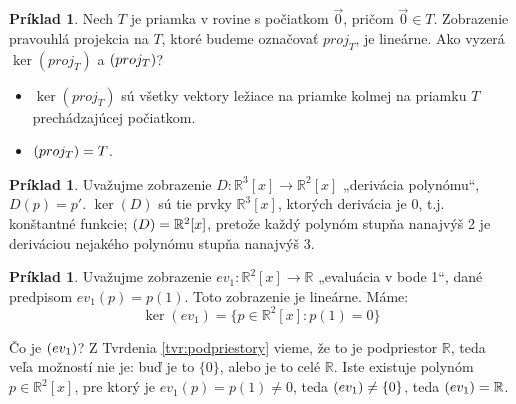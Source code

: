 \documentclass[11pt,a4paper]{article}
\theoremstyle{definition}
\newtheorem{priklad}[definicia]{Príklad}
\theoremstyle{plain}
\theoremstyle{remark}
\newcommand{\R}{\mathbb{R}}
\let\Im\relax
\DeclareMathOperator{\Im}{Im}
\begin{document}
\begin{priklad} \label{ex:projekcia}
Nech $T$ je priamka v rovine s počiatkom $\vec{0}$, pričom $\vec{0} \in T$. Zobrazenie pravouhlá projekcia na $T$, ktoré budeme označovať $proj_T$, je lineárne. Ako vyzerá $\ker(proj_T)$ a $\Im(proj_T)$?

\begin{center}
\end{center}

\begin{itemize}
    \item $\ker(proj_T)$ sú všetky vektory ležiace na priamke kolmej na priamku $T$ prechádzajúcej počiatkom.
    \item $\Im(proj_T) = T$.
\end{itemize}
\end{priklad}

\begin{priklad} \label{ex:derivacia}
Uvažujme zobrazenie $D: \R^3[x] \to \R^2[x]$ „derivácia polynómu“, $D(p) = p'$. $\ker(D)$ sú tie prvky $\R^3[x]$, ktorých derivácia je $0$, t.j. konštantné funkcie; $\Im(D) = \R^2[x]$, pretože každý polynóm stupňa nanajvýš 2 je deriváciou nejakého polynómu stupňa nanajvýš 3.
\end{priklad}

\begin{priklad} \label{ex:evaluacia}
Uvažujme zobrazenie $ev_1: \R^2[x] \to \R$ „evaluácia v bode 1“, dané predpisom $ev_1(p) = p(1)$. Toto zobrazenie je lineárne. Máme:
\[ \ker(ev_1) = \{ p \in \R^2[x] : p(1) = 0 \} \]

\begin{center}
\end{center}

Čo je $\Im(ev_1)$? Z Tvrdenia \ref{tvr:podpriestory} vieme, že to je podpriestor $\R$, teda veľa možností nie je: buď je to $\{0\}$, alebo je to celé $\R$. Iste existuje polynóm $p \in \R^2[x]$, pre ktorý je $ev_1(p) = p(1) \neq 0$, teda $\Im(ev_1) \neq \{0\}$, teda $\Im(ev_1) = \R$.
\end{priklad}
\end{document}
